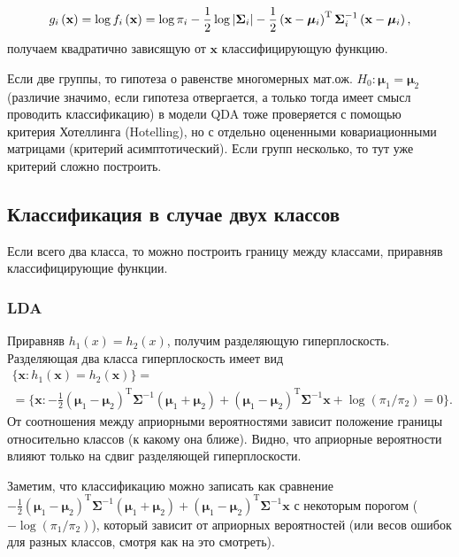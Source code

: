		$$g_i\left(\mathbf{x}\right) = \log f_i\left(\mathbf{x}\right) = \log \pi_i - \frac{1}{2}\log\left\vert\bm{\Sigma}_i\right\vert -  \frac{1}{2}\left(\mathbf{x} - \bm{\mu}_i\right)^{\mathrm{T}}\bm{\Sigma}_i^{-1}\left(\mathbf{x} - \bm{\mu}_i\right),$$
получаем квадратично зависящую от $\mathbf{x}$ классифицирующую функцию.

\begin{note}
  Если две группы, то гипотеза о равенстве многомерных мат.ож. $H_0: \bm{\mu}_1 = \bm{\mu}_2$ (различие значимо, если гипотеза отвергается, а только тогда имеет смысл проводить классификацию) в модели QDA тоже проверяется с помощью критерия Хотеллинга (Hotelling), но с отдельно оцененными ковариационными матрицами (критерий асимптотический). Если групп несколько, то тут уже критерий сложно построить.
\end{note}

\subsection{Классификация в случае двух классов}
Если всего два класса, то можно построить границу между классами, приравняв классифицирующие функции.
\subsubsection{LDA} %
Приравняв $h_1(x)= h_2(x)$, получим разделяющую гиперплоскость.
Разделяющая два класса гиперплоскость имеет вид
\begin{multline*}
  \{\mathbf{x} : h_1(\mathbf{x}) = h_2(\mathbf{x})\} =\\ = \{\mathbf{x} : -\frac{1}{2} (\bm{\mu}_1 - \bm{\mu}_2)^\mathrm{T} \mathbf{\bm{\Sigma}}^{-1}(\bm{\mu}_1 + \bm{\mu}_2) + (\bm{\mu}_1 - \bm{\mu}_2)^\mathrm{T} \mathbf{\bm{\Sigma}}^{-1}\mathbf{x} + \log(\pi_1/\pi_2) = 0\}.
\end{multline*}
От соотношения между априорными вероятностями зависит положение границы относительно классов (к какому она ближе).
Видно, что априорные вероятности влияют только на сдвиг разделяющей гиперплоскости.

Заметим, что классификацию можно записать как сравнение $-\frac{1}{2} (\bm{\mu}_1 - \bm{\mu}_2)^\mathrm{T} \mathbf{\bm{\Sigma}}^{-1}(\bm{\mu}_1 + \bm{\mu}_2) + (\bm{\mu}_1 - \bm{\mu}_2)^\mathrm{T} \mathbf{\bm{\Sigma}}^{-1}\mathbf{x}$ с некоторым порогом ($-\log(\pi_1/\pi_2)$), который зависит от априорных вероятностей
(или весов ошибок для разных классов, смотря как на это смотреть).

